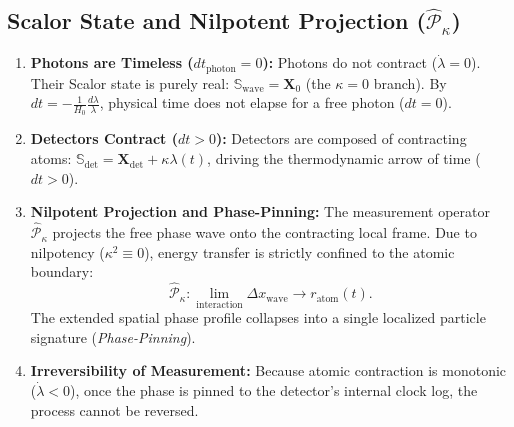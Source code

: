 \documentclass[11pt,a4paper]{article}
\begin{document}
\subsection{Scalor State and Nilpotent Projection (\texorpdfstring{$\hat{\mathcal{P}}_\kappa$}{P_kappa})}
\begin{enumerate}
    \item \textbf{Photons are Timeless ($dt_{\mathrm{photon}} = 0$):} Photons do not contract ($\dot{\lambda} = 0$). Their Scalor state is purely real: $\mathbb{S}_{\mathrm{wave}} = \mathbf{X}_0$ (the $\kappa = 0$ branch). By $dt = -\frac{1}{H_0}\frac{d\lambda}{\lambda}$, physical time does not elapse for a free photon ($dt = 0$).
    \item \textbf{Detectors Contract ($dt > 0$):} Detectors are composed of contracting atoms: $\mathbb{S}_{\mathrm{det}} = \mathbf{X}_{\mathrm{det}} + \kappa \lambda(t)$, driving the thermodynamic arrow of time ($dt > 0$).
    \item \textbf{Nilpotent Projection and Phase-Pinning:} The measurement operator $\hat{\mathcal{P}}_\kappa$ projects the free phase wave onto the contracting local frame. Due to nilpotency ($\kappa^2 \equiv 0$), energy transfer is strictly confined to the atomic boundary:
          \begin{equation}
              \hat{\mathcal{P}}_\kappa : \lim_{\mathrm{interaction}} \Delta x_{\mathrm{wave}} \to r_{\mathrm{atom}}(t).
              \label{eq:nilpotent_sonum_em}
          \end{equation}
          The extended spatial phase profile collapses into a single localized particle signature (\textit{Phase-Pinning}).
    \item \textbf{Irreversibility of Measurement:} Because atomic contraction is monotonic ($\dot{\lambda} < 0$), once the phase is pinned to the detector's internal clock log, the process cannot be reversed.
\end{enumerate}
\end{document}

